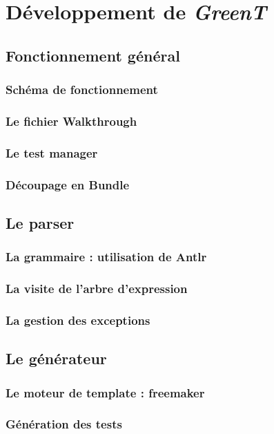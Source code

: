 	\chapter{Développement de \textit{GreenT}}
		\section{Fonctionnement général}
			\subsection{Schéma de fonctionnement}
			\subsection{Le fichier Walkthrough}
			\subsection{Le test manager}
			\subsection{Découpage en Bundle}

		\section{Le parser}
			\subsection{La grammaire : utilisation de Antlr}
			\subsection{La visite de l'arbre d'expression}
			\subsection{La gestion des exceptions}
		\section{Le générateur}
			\subsection{Le moteur de template : freemaker}
			\subsection{Génération des tests}
